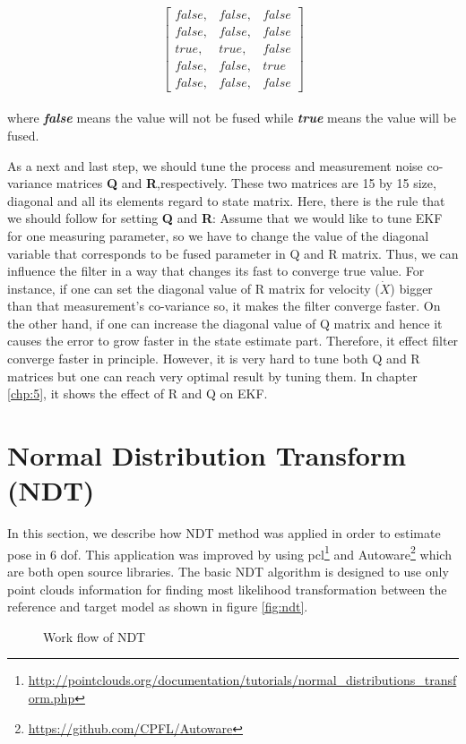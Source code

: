 \\
\begin{equation*}\label{eq:config}
    \begin{bmatrix}
    false,&false,&false\\
    false,&false,&false\\
    true,&true,&false\\
    false,&false,&true\\
    false,&false,&false
    \end{bmatrix}
\end{equation*}
\\
\noindent where \textbf{\textit{false}} means the value will not be fused while \textbf{\textit{true}} means the value will be fused.

\par As a next and last step, we should tune the process and measurement noise co-variance matrices \textbf {Q} and \textbf{R},respectively. These two matrices are 15 by 15 size, diagonal and all its elements regard to state matrix. Here, there is the rule that we should follow for setting \textbf {Q} and \textbf{R}: Assume that we would like to tune EKF for one measuring parameter, so we have to change the value of the diagonal variable that corresponds to be fused parameter in Q and R matrix. Thus, we can influence the filter in a way that changes its fast to converge true value. For instance, if one can set the diagonal value of R matrix for velocity ($\dot X$) bigger than that measurement’s co-variance so, it makes the filter converge faster. On the other hand, if one can increase the diagonal value of Q matrix and hence it causes the error to grow faster in the state estimate part. Therefore, it effect filter converge faster in principle. However, it is very hard to tune both Q and R matrices but one can reach very optimal result by tuning them. In chapter \ref{chp:5}, it shows the effect of R and Q on EKF.

\section{Normal Distribution Transform (NDT)}
In this section, we describe how NDT method was applied in order to estimate pose in 6 \acrfull{dof}. This application was improved by using \acrfull{pcl}\footnote{\url{http://pointclouds.org/documentation/tutorials/normal_distributions_transform.php}} and Autoware\footnote{\url{https://github.com/CPFL/Autoware}} which are both open source libraries. The basic NDT algorithm is designed to use only point clouds information for finding  most likelihood transformation between the reference and target model as shown in figure \ref{fig:ndt}.
\vspace{-0.5cm}
\begin{figure}[H]
    \centering
    \hfill
    \caption{Work flow of NDT}
\end{figure} 

